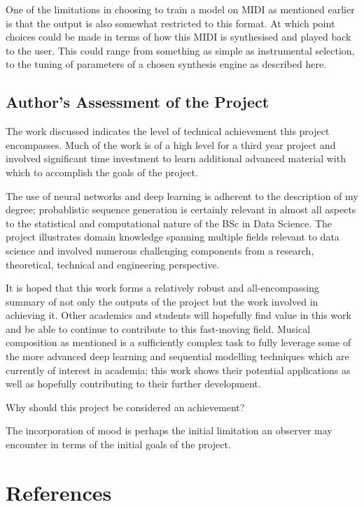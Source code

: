 \documentclass[12pt,]{article}
\begin{document}
One of the limitations in choosing to train a model on MIDI as mentioned
earlier is that the output is also somewhat restricted to this format.
At which point choices could be made in terms of how this MIDI is
synthesised and played back to the user. This could range from something
as simple as instrumental selection, to the tuning of parameters of a
chosen synthesis engine as described here.

\hypertarget{authors-assessment-of-the-project}{%
\subsection{Author's Assessment of the
Project}\label{authors-assessment-of-the-project}}

The work discussed indicates the level of technical achievement this
project encompasses. Much of the work is of a high level for a third
year project and involved significant time investment to learn
additional advanced material with which to accomplish the goals of the
project.

The use of neural networks and deep learning is adherent to the
description of my degree; probablistic sequence generation is certainly
relevant in almost all aspects to the statistical and computational
nature of the BSc in Data Science. The project illustrates domain
knowledge spanning multiple fields relevant to data science and involved
numerous challenging components from a research, theoretical, technical
and engineering perspective.

It is hoped that this work forms a relatively robust and
all-encompassing summary of not only the outputs of the project but the
work involved in achieving it. Other academics and students will
hopefully find value in this work and be able to continue to contribute
to this fast-moving field. Musical composition as mentioned is a
sufficiently complex task to fully leverage some of the more advanced
deep learning and sequential modelling techniques which are currently of
interest in academia; this work shows their potential applications as
well as hopefully contributing to their further development.

Why should this project be considered an achievement?

The incorporation of mood is perhaps the initial limitation an observer
may encounter in terms of the initial goals of the project.

\hypertarget{references}{%
\section*{References}\label{references}}
\end{document}
